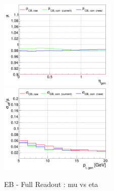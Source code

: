








\begin{figure}
\includegraphics[width=0.495\textwidth]{./ECAL_plots/plotsPU/EB/FULL/pdf/EBFULL_GENETA_0005_0020_MuOverBins.pdf}
\includegraphics[width=0.495\textwidth]{./ECAL_plots/plotsPU/EB/FULL/pdf/EBFULL_GENPT_0005_0020_EffSigmaOverBins.pdf}
\caption{EB - Full Readout : mu vs eta}
\end{figure}





